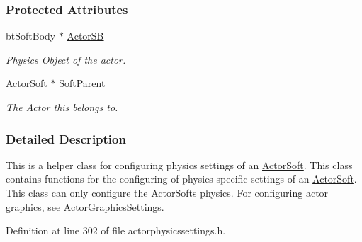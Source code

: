 \subsubsection*{Protected Attributes}
\begin{DoxyCompactItemize}
\item 
\hypertarget{classMezzanine_1_1ActorSoftPhysicsSettings_a44408487d6458ee64320be6d1283c1c0}{
btSoftBody $\ast$ \hyperlink{classMezzanine_1_1ActorSoftPhysicsSettings_a44408487d6458ee64320be6d1283c1c0}{ActorSB}}
\label{classMezzanine_1_1ActorSoftPhysicsSettings_a44408487d6458ee64320be6d1283c1c0}

\begin{DoxyCompactList}\small\item\em Physics Object of the actor. \item\end{DoxyCompactList}\item 
\hypertarget{classMezzanine_1_1ActorSoftPhysicsSettings_aa895658bc511f318b4a31234823d3e5c}{
\hyperlink{classMezzanine_1_1ActorSoft}{ActorSoft} $\ast$ \hyperlink{classMezzanine_1_1ActorSoftPhysicsSettings_aa895658bc511f318b4a31234823d3e5c}{SoftParent}}
\label{classMezzanine_1_1ActorSoftPhysicsSettings_aa895658bc511f318b4a31234823d3e5c}

\begin{DoxyCompactList}\small\item\em The Actor this belongs to. \item\end{DoxyCompactList}\end{DoxyCompactItemize}


\subsubsection{Detailed Description}
This is a helper class for configuring physics settings of an \hyperlink{classMezzanine_1_1ActorSoft}{ActorSoft}. This class contains functions for the configuring of physics specific settings of an \hyperlink{classMezzanine_1_1ActorSoft}{ActorSoft}. This class can only configure the ActorSofts physics. For configuring actor graphics, see ActorGraphicsSettings. 

Definition at line 302 of file actorphysicssettings.h.



